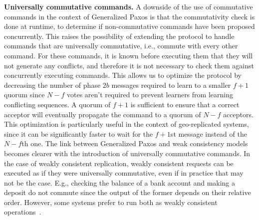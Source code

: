 \noindent \textbf{Universally commutative commands.}
A downside of the use of commutative commands in the
context of Generalized Paxos is that the commutativity check is done
at runtime, to determine if non-commutative commands have
been proposed concurrently.
This raises the possibility of extending the protocol to handle
commands that are universally commutative, i.e., commute with every
other command. For these commands, it is known before executing them
that they will not generate any conflicts, and therefore it is not
necessary to check them against concurrently executing commands.  This
allows us to optimize the protocol by decreasing the number of phase
$2b$ messages required to learn to a smaller $f+1$ quorum since $N-f$ votes aren't required to prevent learners from learning conflicting sequences. A quorum of $f+1$ is sufficient to
ensure that a correct acceptor will eventually
propagate the command to a quorum of $N-f$ acceptors. This optimization is particularly useful in the context of 
geo-replicated systems, since it can be significantly faster to wait for the $f+1$st message instead of the $N-f$th one. 
The link between Generalized Paxos and weak consistency models  becomes clearer with the introduction of universally commutative commands. In the case of weakly consistent replication, weakly consistent requests can be executed as if they were universally commutative, even if in practice that may not be the case. E.g., checking the balance of a bank account and making a deposit do not commute since the output of the former depends on their relative order. However, some systems prefer to run both as weakly consistent operations~\cite{Li2012}. 